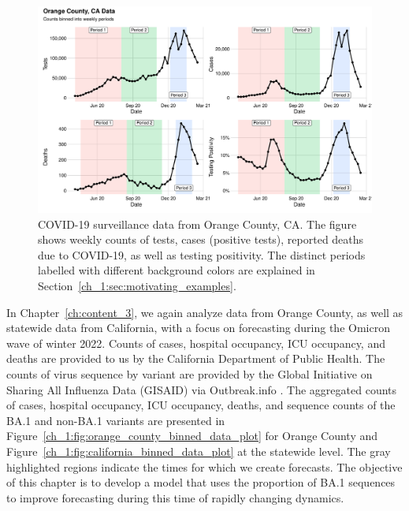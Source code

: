 \begin{figure}
    \centering
    \includegraphics[width=1.0\columnwidth]{binned_data_plot}
    \caption[COVID-19 surveillance data from Orange County, CA.]{
    COVID-19 surveillance data from Orange County, CA.
    The figure shows weekly counts of tests, cases (positive tests), reported deaths due to COVID-19, as well as testing positivity.
    The distinct periods labelled with different background colors are explained in Section~\ref{ch_1:sec:motivating_examples}.}
    \label{ch_1:fig:binned_data_plot}
\end{figure}

In Chapter~\ref{ch:content_3}, we again analyze data from Orange County, as well as statewide data from California, with a focus on forecasting during the Omicron wave of winter 2022. 
Counts of cases, hospital occupancy, ICU occupancy, and deaths are provided to us by the California Department of Public Health.
The counts of virus sequence by variant are provided by the Global Initiative on Sharing All Influenza Data (GISAID) \citep{shu2017gisaid} via Outbreak.info \citep{Gangavarapu2023}.
The aggregated counts of cases, hospital occupancy, ICU occupancy, deaths, and sequence counts of the BA.1 and non-BA.1 variants are presented in Figure~\ref{ch_1:fig:orange_county_binned_data_plot} for Orange County and Figure~\ref{ch_1:fig:california_binned_data_plot} at the statewide level.
The gray highlighted regions indicate the times for which we create forecasts.
The objective of this chapter is to develop a model that uses the proportion of BA.1 sequences to improve forecasting during this time of rapidly changing dynamics.

